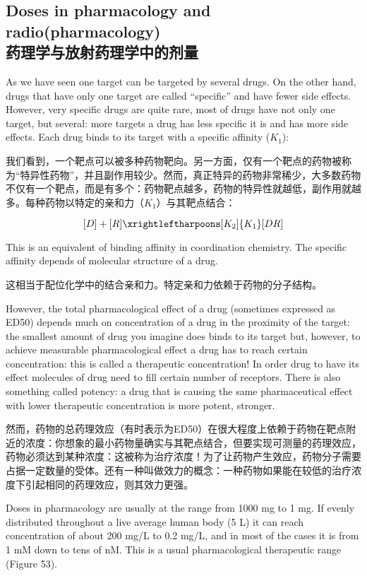 \documentclass[dvipsnames, svgnames,a4paper,11pt]{article}
\begin{document}
\subsection{Doses in pharmacology and radio(pharmacology)\\药理学与放射药理学中的剂量}

As we have seen one target can be targeted by several drugs. On the other hand, drugs that have only one target are called “specific” and have fewer side effects. However, very specific drugs are quite rare, most of drugs have not only one target, but several: more targets a drug has less specific it is and has more side effects. Each drug binds to its target with a specific affinity ($K_1$):

我们看到，一个靶点可以被多种药物靶向。另一方面，仅有一个靶点的药物被称为“特异性药物”，并且副作用较少。然而，真正特异的药物非常稀少，大多数药物不仅有一个靶点，而是有多个：药物靶点越多，药物的特异性就越低，副作用就越多。每种药物以特定的亲和力（$K_1$）与其靶点结合：

$$ [D] + [R] \xrightleftharpoons[K_2]{K_1} [DR]$$


This is an equivalent of binding affinity in coordination chemistry. The specific affinity depends of molecular structure of a drug.

这相当于配位化学中的结合亲和力。特定亲和力依赖于药物的分子结构。

However, the total pharmacological effect of a drug (sometimes expressed as ED50) depends much on concentration of a drug in the proximity of the target: the smallest amount of drug you imagine does binds to its target but, however, to achieve measurable pharmacological effect a drug has to reach certain concentration: this is called a therapeutic concentration! In order drug to have its effect molecules of drug need to fill certain number of receptors. There is also something called potency: a drug that is causing the same pharmaceutical effect with lower therapeutic concentration is more potent, stronger.

然而，药物的总药理效应（有时表示为ED50）在很大程度上依赖于药物在靶点附近的浓度：你想象的最小药物量确实与其靶点结合，但要实现可测量的药理效应，药物必须达到某种浓度：这被称为治疗浓度！为了让药物产生效应，药物分子需要占据一定数量的受体。还有一种叫做效力的概念：一种药物如果能在较低的治疗浓度下引起相同的药理效应，则其效力更强。

Doses in pharmacology are usually at the range from 1000 mg to 1 mg. If evenly distributed throughout a live average human body (5 L) it can reach concentration of about 200 mg/L to 0.2 mg/L, and in most of the cases it is from 1 mM down to tens of nM. This is a usual pharmacological therapeutic range (Figure 53).
\end{document}
